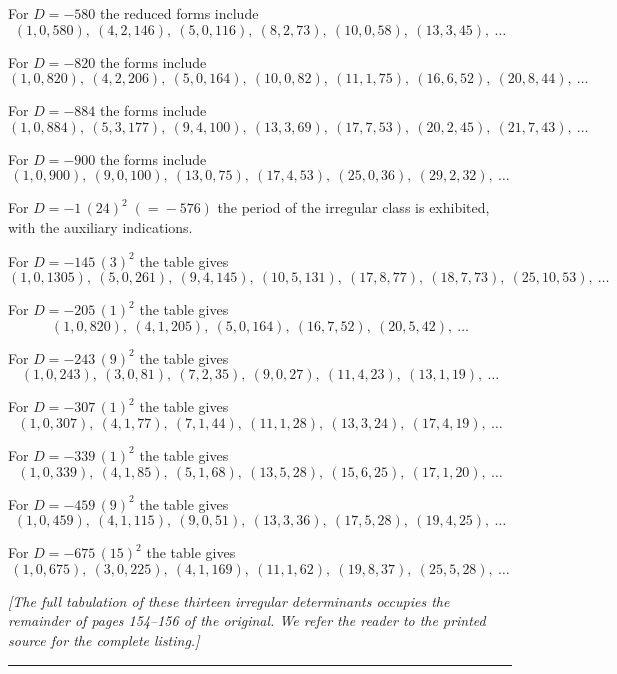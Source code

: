 \documentclass[11pt,a4paper]{article}
\begin{document}
\medskip

\noindent For $D=-580$ the reduced forms include
\[
(1,0,580),\ (4,2,146),\ (5,0,116),\ (8,2,73),\ (10,0,58),\ (13,3,45),\ \ldots
\]

\noindent For $D=-820$ the forms include
\[
(1,0,820),\ (4,2,206),\ (5,0,164),\ (10,0,82),\ (11,1,75),\ (16,6,52),\ (20,8,44),\ \ldots
\]

\noindent For $D=-884$ the forms include
\[
(1,0,884),\ (5,3,177),\ (9,4,100),\ (13,3,69),\ (17,7,53),\ (20,2,45),\ (21,7,43),\ \ldots
\]

\noindent For $D=-900$ the forms include
\[
(1,0,900),\ (9,0,100),\ (13,0,75),\ (17,4,53),\ (25,0,36),\ (29,2,32),\ \ldots
\]

\noindent For $D=-1\,(24)^2 \;(=\!-576)$ the period of the irregular class is exhibited, with the auxiliary indications.

\medskip

\noindent For $D=-145\,(3)^2$ the table gives
\[
(1,0,1305),\ (5,0,261),\ (9,4,145),\ (10,5,131),\ (17,8,77),\ (18,7,73),\ (25,10,53),\ \ldots
\]

\noindent For $D=-205\,(1)^2$ the table gives
\[
(1,0,820),\ (4,1,205),\ (5,0,164),\ (16,7,52),\ (20,5,42),\ \ldots
\]

\noindent For $D=-243\,(9)^2$ the table gives
\[
(1,0,243),\ (3,0,81),\ (7,2,35),\ (9,0,27),\ (11,4,23),\ (13,1,19),\ \ldots
\]

\noindent For $D=-307\,(1)^2$ the table gives
\[
(1,0,307),\ (4,1,77),\ (7,1,44),\ (11,1,28),\ (13,3,24),\ (17,4,19),\ \ldots
\]

\noindent For $D=-339\,(1)^2$ the table gives
\[
(1,0,339),\ (4,1,85),\ (5,1,68),\ (13,5,28),\ (15,6,25),\ (17,1,20),\ \ldots
\]

\noindent For $D=-459\,(9)^2$ the table gives
\[
(1,0,459),\ (4,1,115),\ (9,0,51),\ (13,3,36),\ (17,5,28),\ (19,4,25),\ \ldots
\]

\noindent For $D=-675\,(15)^2$ the table gives
\[
(1,0,675),\ (3,0,225),\ (4,1,169),\ (11,1,62),\ (19,8,37),\ (25,5,28),\ \ldots
\]

\medskip

\noindent\textit{[The full tabulation of these thirteen irregular determinants occupies the remainder of pages 154--156 of the original. We refer the reader to the printed source for the complete listing.]}

\bigskip

\noindent\rule{\textwidth}{0.4pt}
\vspace{1em}
\end{document}
